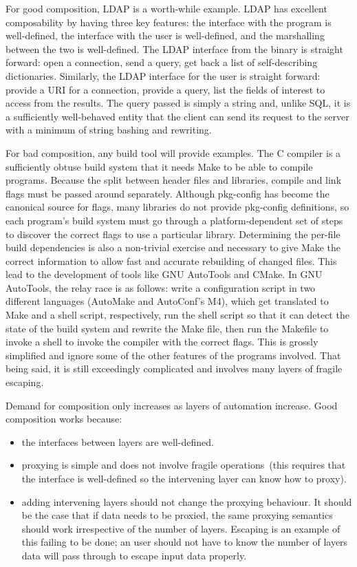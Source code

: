 \documentclass[letterpaper,twocolumn,10pt]{article}
\begin{document}
For good composition, LDAP is a worth-while example. LDAP has excellent composability by having three key features: the interface with the program is well-defined, the interface with the user is well-defined, and the marshalling between the two is well-defined. The LDAP interface from the binary is straight forward: open a connection, send a query, get back a list of self-describing dictionaries. Similarly, the LDAP interface for the user is straight forward: provide a URI for a connection, provide a query, list the fields of interest to access from the results. The query passed is simply a string and, unlike SQL, it is a sufficiently well-behaved entity that the client can send its request to the server with a minimum of string bashing and rewriting.

For bad composition, any build tool will provide examples. The C compiler is a sufficiently obtuse build system that it needs Make to be able to compile programs. Because the split between header files and libraries, compile and link flags must be passed around separately. Although pkg-config has become the canonical source for flags, many libraries do not provide pkg-config definitions, so each program's build system must go through a platform-dependent set of steps to discover the correct flags to use a particular library. Determining the per-file build dependencies is also a non-trivial exercise and necessary to give Make the correct information to allow fast and accurate rebuilding of changed files. This lead to the development of tools like GNU AutoTools and CMake. In GNU AutoTools, the relay race is as follows: write a configuration script in two different languages (AutoMake and AutoConf's M4), which get translated to Make and a shell script, respectively, run the shell script so that it can detect the state of the build system and rewrite the Make file, then run the Makefile to invoke a shell to invoke the compiler with the correct flags. This is grossly simplified and ignore some of the other features of the programs involved. That being said, it is still exceedingly complicated and involves many layers of fragile escaping.

Demand for composition only increases as layers of automation increase. Good composition works because:

\begin{itemize}
\item the interfaces between layers are well-defined.
\item proxying is simple and does not involve fragile operations~(this requires that the interface is well-defined so the intervening layer can know how to proxy).
\item adding intervening layers should not change the proxying behaviour. It should be the case that if data needs to be proxied, the same proxying semantics should work irrespective of the number of layers. Escaping is an example of this failing to be done; an user should not have to know the number of layers data will pass through to escape input data properly.
\end{itemize}
\end{document}
